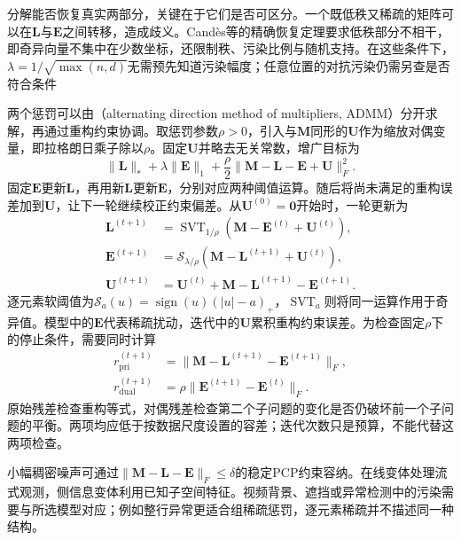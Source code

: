 分解能否恢复真实两部分，关键在于它们是否可区分。一个既低秩又稀疏的矩阵可以在$\bm{L}$与$\bm{E}$之间转移，造成歧义。Candès等的精确恢复定理要求低秩部分不相干，即奇异向量不集中在少数坐标，还限制秩、污染比例与随机支持。在这些条件下，$\lambda=1/\sqrt{\max(n,d)}$无需预先知道污染幅度；任意位置的对抗污染仍需另查是否符合条件

两个惩罚可以由（alternating direction method of multipliers, ADMM）分开求解，再通过重构约束协调。取惩罚参数$\rho>0$，引入与$\bm{M}$同形的$\bm{U}$作为缩放对偶变量，即拉格朗日乘子除以$\rho$。固定$\bm{U}$并略去无关常数，增广目标为
\[
  \lVert\bm{L}\rVert_*+\lambda\lVert\bm{E}\rVert_1
  +\frac{\rho}{2}
   \lVert\bm{M}-\bm{L}-\bm{E}+\bm{U}\rVert_F^2.
\]
固定$\bm{E}$更新$\bm{L}$，再用新$\bm{L}$更新$\bm{E}$，分别对应两种阈值运算。随后将尚未满足的重构误差加到$\bm{U}$，让下一轮继续校正约束偏差。从$\bm{U}^{(0)}=\bm{0}$开始时，一轮更新为
\begin{equation}
  \begin{aligned}
  \bm{L}^{(t+1)}&=\operatorname{SVT}_{1/\rho}
                  (\bm{M}-\bm{E}^{(t)}+\bm{U}^{(t)}),\\
  \bm{E}^{(t+1)}&=\mathcal{S}_{\lambda/\rho}
                  (\bm{M}-\bm{L}^{(t+1)}+\bm{U}^{(t)}),\\
  \bm{U}^{(t+1)}&=\bm{U}^{(t)}
                   +\bm{M}-\bm{L}^{(t+1)}-\bm{E}^{(t+1)}.
  \end{aligned}
  \label{eq:dim-rpca-admm}
\end{equation}
逐元素软阈值为$\mathcal{S}_{a}(u)=\operatorname{sign}(u)(|u|-a)_+$，$\operatorname{SVT}_{a}$则将同一运算作用于奇异值。模型中的$\bm{E}$代表稀疏扰动，迭代中的$\bm{U}$累积重构约束误差。为检查固定$\rho$下的停止条件，需要同时计算
\[
  \begin{aligned}
    r_{\mathrm{pri}}^{(t+1)}
      &=\lVert\bm{M}-\bm{L}^{(t+1)}-\bm{E}^{(t+1)}\rVert_F,\\
    r_{\mathrm{dual}}^{(t+1)}
      &=\rho\lVert\bm{E}^{(t+1)}-\bm{E}^{(t)}\rVert_F.
  \end{aligned}
\]
原始残差检查重构等式，对偶残差检查第二个子问题的变化是否仍破坏前一个子问题的平衡。两项均应低于按数据尺度设置的容差；迭代次数只是预算，不能代替这两项检查。

小幅稠密噪声可通过$\lVert\bm{M}-\bm{L}-\bm{E}\rVert_F\leq\delta$的稳定PCP约束容纳。在线变体处理流式观测，侧信息变体利用已知子空间特征。视频背景、遮挡或异常检测中的污染需要与所选模型对应；例如整行异常更适合组稀疏惩罚，逐元素稀疏并不描述同一种结构。

